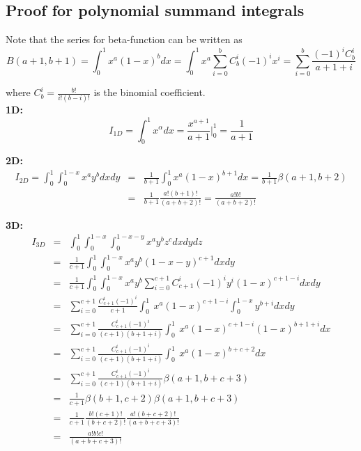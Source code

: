 \subsection{Proof for polynomial summand integrals}
\label{appendix-proof-simplexintegral}


\noindent
Note that the series for beta-function can be written as
\[B(a+1,b+1) = \int_0^1 x^a (1-x)^b dx = \int_0^1 x^a \sum_{i=0}^b C_b^i (-1)^i x^i = \sum_{i=0}^b \frac{(-1)^i C_b^i}{a+1+i}\]

\noindent
where $C_b^i = \frac{b!}{i!(b-i)!}$ is the binomial coefficient. \\

\noindent
\textbf{1D:} \\

\begin{equation}
	I_{1D} = \int_0^1 x^{\alpha} dx = \frac{x^{a + 1}}{a + 1} \biggr |_0^1 = \frac{1}{a + 1}
\end{equation}

\noindent
\textbf{2D:} \\

\begin{eqnarray*}
	I_{2D} = \int_0^1 \int_0^{1-x} x^{a} y^{b} dx dy
	& = & \frac{1}{b+1} \int_0^1 x^{a} (1-x)^{b+1} dx = \frac{1}{b+1} \beta(a + 1, b + 2) \\
	& = & \frac{1}{b+1} \frac{a!(b+1)!}{(a+b+2)!} = \frac{a!b!}{(a+b+2)!}
\end{eqnarray*}

\noindent
\textbf{3D:} \\

\begin{eqnarray*}
	I_{3D}
	& = & \int_0^1 \int_0^{1-x} \int_0^{1-x-y} x^a y^b z^c dx dy dz \\
	& = & \frac{1}{c+1} \int_0^1 \int_0^{1-x} x^a y^b (1-x-y)^{c+1} dx dy \\
	& = & \frac{1}{c+1} \int_0^1 \int_0^{1-x} x^a y^b \sum_{i=0}^{c+1} C_{c+1}^i (-1)^i y^i (1-x)^{c+1-i} dx dy \\
	& = & \sum_{i=0}^{c+1} \frac{C_{c+1}^i (-1)^i}{c+1} \int_0^1 \ x^a (1-x)^{c+1-i} \int_0^{1-x} y^{b+i} dx dy \\
	& = & \sum_{i=0}^{c+1} \frac{C_{c+1}^i (-1)^i}{(c+1)(b+1+i)} \int_0^1 \ x^a (1-x)^{c+1-i} (1-x)^{b+1+i} dx \\
	& = & \sum_{i=0}^{c+1} \frac{C_{c+1}^i (-1)^i}{(c+1)(b+1+i)} \int_0^1 \ x^a (1-x)^{b+c+2} dx \\
	& = & \sum_{i=0}^{c+1} \frac{C_{c+1}^i (-1)^i}{(c+1)(b+1+i)} \beta(a+1, b+c+3) \\
	& = & \frac{1}{c+1} \beta(b+1,c+2) \beta(a+1, b+c+3) \\
	& = & \frac{1}{c+1} \frac{b!(c+1)!}{(b+c+2)!} \frac{a! (b+c+2)!}{(a+b+c+3)!} \\
	& = &  \frac{a! b! c!}{(a+b+c+3)!}
\end{eqnarray*}